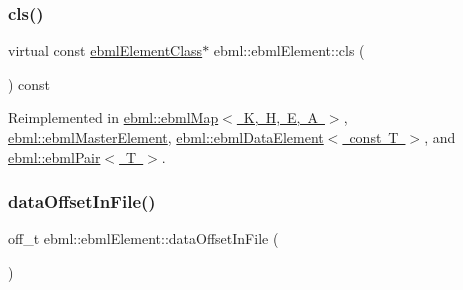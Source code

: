 \mbox{\label{classebml_1_1ebmlElement_a15cf59e94b01e2c49ec96512b9bd9d90}} 
\subsubsection{\texorpdfstring{cls()}{cls()}}
{\footnotesize\ttfamily virtual const \mbox{\hyperlink{classebml_1_1ebmlElementClass}{ebml\+Element\+Class}}$\ast$ ebml\+::ebml\+Element\+::cls (\begin{DoxyParamCaption}{ }\end{DoxyParamCaption}) const\hspace{0.3cm}{\ttfamily [virtual]}}



Reimplemented in \mbox{\hyperlink{classebml_1_1ebmlMap_a44f835be40d70d8425b8e08fbe0ce77f}{ebml\+::ebml\+Map$<$ K, H, E, A $>$}}, \mbox{\hyperlink{classebml_1_1ebmlMasterElement_a4073fb3f7ce3dda153384821714df29e}{ebml\+::ebml\+Master\+Element}}, \mbox{\hyperlink{classebml_1_1ebmlDataElement_3_01const_01T_01_4_a27173a9d7784ce0cfca71e1c72c36ec7}{ebml\+::ebml\+Data\+Element$<$ const T $>$}}, and \mbox{\hyperlink{classebml_1_1ebmlPair_ad1244458e1390cbf567dfd460b0002f2}{ebml\+::ebml\+Pair$<$ T $>$}}.

\mbox{\label{classebml_1_1ebmlElement_a725798d0e8cee171475f133fa36b3324}} 
\subsubsection{\texorpdfstring{data\+Offset\+In\+File()}{dataOffsetInFile()}}
{\footnotesize\ttfamily off\+\_\+t ebml\+::ebml\+Element\+::data\+Offset\+In\+File (\begin{DoxyParamCaption}{ }\end{DoxyParamCaption})}

\mbox{\label{classebml_1_1ebmlElement_a0304c2cdd1694a706d8846e596d15ec6}} 
